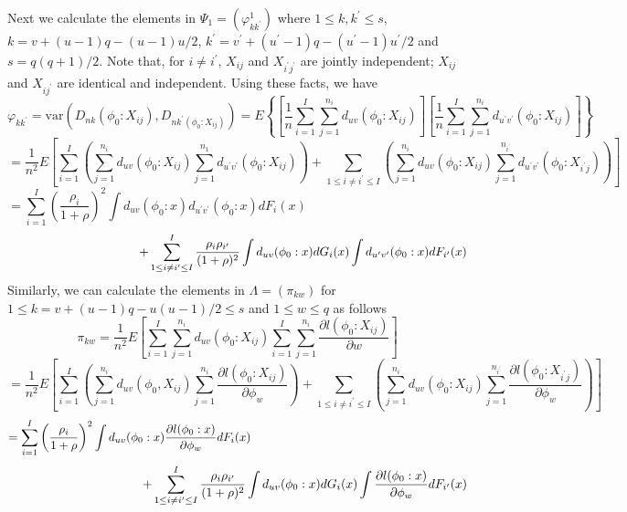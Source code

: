 \documentclass[12]{interact}
\theoremstyle{plain}%
\theoremstyle{definition}
\theoremstyle{remark}
\begin{document}
Next we calculate the elements in $\Psi_1=(\varphi_{kk^\prime}^1)$ where $1 \le k, k^\prime\le s$,  $k = v + (u-1)q -(u-1)u/2$, $k^\prime = v^\prime + (u^\prime-1)q -(u^\prime-1)u^\prime/2$ and $s=q(q+1)/2$. Note that, for $i \ne i^\prime$, $X_{ij}$ and $X_{i^\prime j^\prime}$ are jointly independent; $X_{ij}$ and $X_{ij^\prime}$ are identical and independent. Using these facts, we have
$$
\varphi_{kk^\prime} = \mbox{var}\left( D_{nk}(\phi_0:X_{ij}), D_{nk^\prime(\phi_0:X_{ij})} \right)
=E\left\{ \left[ \frac{1}{n}\sum_{i=1}^I\sum_{j=1}^{n_i}d_{uv}(\phi_0:X_{ij})\right] \left[ \frac{1}{n}\sum_{i=1}^I\sum_{j=1}^{n_i}d_{u^\prime v^\prime}(\phi_0:X_{ij}) \right]\right\}
$$
$$
=\frac{1}{n^2}E\left[\sum_{i=1}^I\left(\sum_{j=1}^{n_i}d_{uv}(\phi_0:X_{ij})\sum_{j=1}^{n_1}d_{u^\prime v^\prime}(\phi_0:X_{ij})\right)+\sum_{1 \le i\ne i^\prime \le I}\left(\sum_{j=1}^{n_i}d_{uv}(\phi_0:X_{ij})\sum_{j=1}^{n_{i^\prime}}d_{u^\prime v^\prime}(\phi_0:X_{i^\prime j}) \right)\right]
$$
$$
=\sum_{i=1}^I \left(\frac{\rho_i}{1+\rho}\right)^2\int d_{uv}(\phi_0:x)d_{u^\prime v^\prime}(\phi_0:x)dF_i(x)\hspace{3in}
$$
\begin{equation}
	\hspace{1.5in}+\sum_{1\le i\ne i^\prime \le I}^I \frac{\rho_i \rho_{i^\prime}}{(1+\rho)^2}\int d_{uv}(\phi_0:x)dG_i(x)\int d_{u^\prime v^\prime}(\phi_0:x)dF_{i^\prime}(x)
\end{equation}
Similarly, we can calculate the elements in $\Lambda=(\pi_{kw})$ for $1 \le k=v+(u-1)q-u(u-1)/2 \le s$ and $1 \le w \le q$ as follows
$$
\pi_{kw}=\frac{1}{n^2}E\left[ \sum_{i=1}^I\sum_{j=1}^{n_i}d_{uv}(\phi_0:X_{ij})\sum_{i=1}^I\sum_{j=1}^{n_i}\frac{\partial l(\phi_0:X_{ij})}{\partial w} \right]
$$
$$
=\frac{1}{n^2}E\left[ \sum_{i=1}^I\left( \sum_{j=1}^{n_i}d_{uv}(\phi_0,X_{ij})\sum_{j=1}^{n_i}\frac{\partial l(\phi_0: X_{ij})}{\partial \phi_w} \right) +\sum_{1 \le i \ne i^\prime \le I}\left( \sum_{j=1}^{n_i}d_{uv}(\phi_0: X_{ij})\sum_{j=1}^{n_{i^\prime}}\frac{\partial l (\phi_0: X_{i^\prime j})}{\partial \phi_w} \right)\right]
$$
$$
=\sum_{i=1}^I \left(\frac{\rho_i}{1+\rho}\right)^2\int d_{uv}(\phi_0:x)\frac{\partial l(\phi_0:x)}{\partial \phi_w}dF_i(x)\hspace{2.5in}
$$
\begin{equation}
	\hspace{1.5in}+\sum_{1\le i\ne i^\prime \le I}^I \frac{\rho_i \rho_{i^\prime}}{(1+\rho)^2}\int d_{uv}(\phi_0:x)dG_i(x)\int \frac{\partial l (\phi_0: x)}{\partial \phi_w}dF_{i^\prime}(x)
\end{equation}
\end{document}
